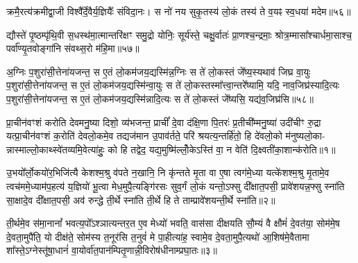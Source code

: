 क्रमै॒रत्य॑क्रमीद्वा॒जी विश्वै᳚र्दे॒वैर्य॒ज्ञियैः᳚ संविदा॒नः। स नो॑ नय सुकृ॒तस्य॑ लो॒कं तस्य॑ ते व॒यꣴ स्व॒धया॑ मदेम॥५६॥

{\anuvakamend[{क्रमै॑र॒ष्टाद॑श॥24॥}]}

द्यौस्ते॑ पृ॒ष्ठम्पृ॑थि॒वी स॒धस्थ॑मा॒त्मान्तरि॑क्षꣳ समु॒द्रो योनिः॒ सूर्य॑स्ते॒ चक्षु॒र्वातः॑ प्रा॒णश्च॒न्द्रमाः॒ श्रोत्र॒म्मासा᳚श्चार्धमा॒साश्च॒ पर्वा᳚ण्यृ॒तवोङ्गा॑नि संवथ्स॒रो म॑हि॒मा॥५७॥

{\anuvakamend[{द्यौः पञ्च॑विꣳशतिः॥25॥}]}

अ॒ग्निः प॒शुरा॑सी॒त्तेना॑यजन्त॒ स ए॒तं लो॒कम॑जय॒द्यस्मि॑न्न॒ग्निः स ते॑ लो॒कस्तं जे᳚ष्य॒स्यथाव॑ जिघ्र वा॒युः प॒शुरा॑सी॒त्तेना॑यजन्त॒ स ए॒तं लो॒कम॑जय॒द्यस्मि॑न्वा॒युः स ते॑ लो॒कस्तस्मा᳚त्त्वा॒न्तरे᳚ष्यामि॒ यदि॒ नाव॒जिघ्र॑स्यादि॒त्यः प॒शुरा॑सी॒त्तेना॑यजन्त॒ स ए॒तं लो॒कम॑जय॒द्यस्मि॑न्नादि॒त्यः स ते॑ लो॒कस्तं जे᳚ष्यसि॒ यद्य॑व॒जिघ्र॑सि॥५८॥

{\anuvakamend[{यस्मि॑न्न॒ष्टौ च॑॥26॥}]}


{}

\setcounter{anuvakam}{0}
प्रा॒चीन॑वꣳशं करोति देवमनु॒ष्या दिशो॒ व्य॑भजन्त॒ प्राचीं᳚ दे॒वा द॑क्षि॒णा पि॒तरः॑ प्र॒तीची᳚म्मनु॒ष्या॑ उदी॑चीꣳ रु॒द्रा यत्प्रा॒चीन॑वꣳशं क॒रोति॑ देवलो॒कमे॒व तद्यज॑मान उ॒पाव॑र्तते॒ परि॑ श्रयत्य॒न्तर्\mbox{}हि॑तो॒ हि दे॑वलो॒को म॑नुष्यलो॒का- न्नास्माल्लो॒काथ्स्वे॑तव्यमि॒वेत्या॑हुः॒ को हि तद्वेद॒ यद्य॒मुष्मि॑ल्लोँ॒के\-ऽस्ति॑ वा॒ न वेति॑ दि॒क्ष्वती॑का॒शान्क॑रोति॥१॥

उ॒भयो᳚र्लो॒कयो॑र॒भिजि॑त्यै केशश्म॒श्रु व॑पते न॒खानि॒ नि कृ॑न्तते मृ॒ता वा ए॒षा त्वग॑मे॒ध्या यत्के॑शश्म॒श्रु मृ॒तामे॒व त्वच॑ममे॒ध्याम॑प॒हत्य॑ य॒ज्ञियो॑ भू॒त्वा मेध॒मुपै॒त्यङ्गि॑रसः सुव॒र्गं लो॒कं यन्तो॒\-ऽफ्सु दी᳚क्षात॒पसी॒ प्रावे॑शयन्न॒फ्सु स्ना॑ति सा॒क्षादे॒व दी᳚क्षात॒पसी॒ अव॑ रुन्द्धे ती॒र्थे स्ना॑ति ती॒र्थे हि ते ताम्प्रावे॑शयन्ती॒र्थे स्ना॑ति॥२॥

ती॒र्थमे॒व स॑मा॒नानां᳚ भवत्य॒पो᳚\-ऽश्ञात्यन्तर॒त ए॒व मेध्यो॑ भवति॒ वास॑सा दीक्षयति सौ॒म्यं वै क्षौमं॑ दे॒वत॑या॒ सोम॑मे॒ष दे॒वता॒मुपै॑ति॒ यो दीक्ष॑ते॒ सोम॑स्य त॒नूर॑सि त॒नुवं॑ मे पा॒हीत्या॑ह॒ स्वामे॒व दे॒वता॒मुपै॒त्यथो॑ आ॒शिष॑मे॒वैतामा शा᳚स्ते॒\-ऽग्नेस्तू॑षा॒धानं॑ वा॒योर्वा॑त॒पान॑म्पितृ॒णान्नी॒विरोष॑धीनाम्प्रघा॒तः॥३॥

